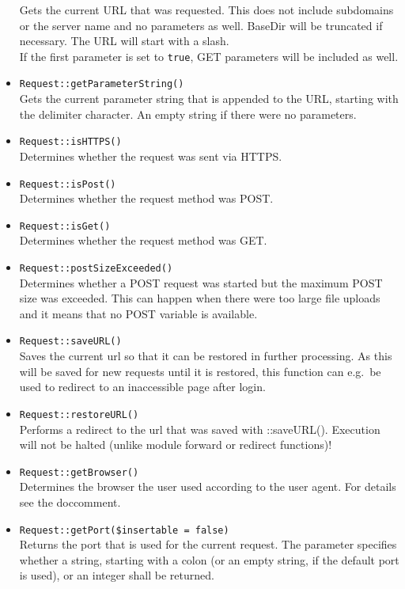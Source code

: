 \documentclass{scrartcl}
\begin{document}
\begin{itemize}
            Gets the current URL that was requested. This does not include subdomains or the server name and no parameters as well. BaseDir will be truncated if necessary. The URL will start with a slash. \\
            If the first parameter is set to \lstinline!true!, GET parameters will be included as well.
         \item \lstinline!Request::getParameterString()! \\
            Gets the current parameter string that is appended to the URL, starting with the delimiter character. An empty string if there were no parameters.
         \item \lstinline!Request::isHTTPS()! \\
            Determines whether the request was sent via HTTPS.
         \item \lstinline!Request::isPost()! \\
            Determines whether the request method was POST.
         \item \lstinline!Request::isGet()! \\
            Determines whether the request method was GET.
         \item \lstinline!Request::postSizeExceeded()! \\
            Determines whether a POST request was started but the maximum POST size was exceeded. This can happen when there were too large file uploads and it means that no POST variable is available.
         \item \lstinline!Request::saveURL()! \\
            Saves the current url so that it can be restored in further processing. As this will be saved for new requests until it is restored, this function can e.g.\ be used to redirect to an inaccessible page after login.
         \item \lstinline!Request::restoreURL()! \\
            Performs a redirect to the url that was saved with ::saveURL(). Execution will not be halted (unlike module forward or redirect functions)!
         \item \lstinline!Request::getBrowser()! \\
            Determines the browser the user used according to the user agent. For details see the doccomment.
         \item \lstinline!Request::getPort($insertable = false)! \\
            Returns the port that is used for the current request. The parameter specifies whether a string, starting with a colon (or an empty string, if the default port is used), or an integer shall be returned.

\end{itemize}
\end{document}
